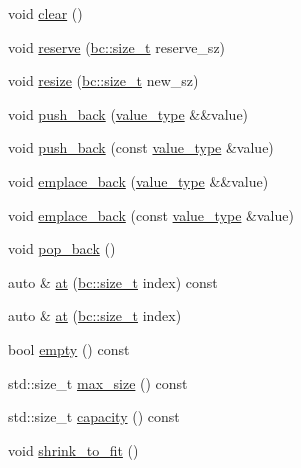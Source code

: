 \begin{DoxyCompactItemize}
\item 
void \hyperlink{structbc_1_1tensors_1_1exprs_1_1Vector_a646e8f07731bfbc89378974310eee5cc}{clear} ()
\item 
void \hyperlink{structbc_1_1tensors_1_1exprs_1_1Vector_acf3a12f0ddeed3faefeab349a1cebe0b}{reserve} (\hyperlink{namespacebc_aaf8e3fbf99b04b1b57c4f80c6f55d3c5}{bc\+::size\+\_\+t} reserve\+\_\+sz)
\item 
void \hyperlink{structbc_1_1tensors_1_1exprs_1_1Vector_a71d51235cb50956b6965102466a7a338}{resize} (\hyperlink{namespacebc_aaf8e3fbf99b04b1b57c4f80c6f55d3c5}{bc\+::size\+\_\+t} new\+\_\+sz)
\item 
void \hyperlink{structbc_1_1tensors_1_1exprs_1_1Vector_a18952a507b7ffe3364789a074642d0d5}{push\+\_\+back} (\hyperlink{structbc_1_1tensors_1_1exprs_1_1Vector_a61ba759af8b26329103ce2b0765dade5}{value\+\_\+type} \&\&value)
\item 
void \hyperlink{structbc_1_1tensors_1_1exprs_1_1Vector_a14256d71cab903b025cd211d2621ad0d}{push\+\_\+back} (const \hyperlink{structbc_1_1tensors_1_1exprs_1_1Vector_a61ba759af8b26329103ce2b0765dade5}{value\+\_\+type} \&value)
\item 
void \hyperlink{structbc_1_1tensors_1_1exprs_1_1Vector_a8d4843ec7993bc29a3c35f8af7faccef}{emplace\+\_\+back} (\hyperlink{structbc_1_1tensors_1_1exprs_1_1Vector_a61ba759af8b26329103ce2b0765dade5}{value\+\_\+type} \&\&value)
\item 
void \hyperlink{structbc_1_1tensors_1_1exprs_1_1Vector_a2e927c004523e23eda06fadc2fa9b836}{emplace\+\_\+back} (const \hyperlink{structbc_1_1tensors_1_1exprs_1_1Vector_a61ba759af8b26329103ce2b0765dade5}{value\+\_\+type} \&value)
\item 
void \hyperlink{structbc_1_1tensors_1_1exprs_1_1Vector_af3c66b395bdbf48d12862d1c3a9c5c1c}{pop\+\_\+back} ()
\item 
auto \& \hyperlink{structbc_1_1tensors_1_1exprs_1_1Vector_ac6b16e6c0550d3298d31c8fac38047e5}{at} (\hyperlink{namespacebc_aaf8e3fbf99b04b1b57c4f80c6f55d3c5}{bc\+::size\+\_\+t} index) const
\item 
auto \& \hyperlink{structbc_1_1tensors_1_1exprs_1_1Vector_a6eb567c4b4a0fdfdf5de8a8e6449a60f}{at} (\hyperlink{namespacebc_aaf8e3fbf99b04b1b57c4f80c6f55d3c5}{bc\+::size\+\_\+t} index)
\item 
bool \hyperlink{structbc_1_1tensors_1_1exprs_1_1Vector_ad040ded42a1cd570993728cb4703cb05}{empty} () const
\item 
std\+::size\+\_\+t \hyperlink{structbc_1_1tensors_1_1exprs_1_1Vector_aa2966322975b102857748f091090fea3}{max\+\_\+size} () const
\item 
std\+::size\+\_\+t \hyperlink{structbc_1_1tensors_1_1exprs_1_1Vector_a65f2772bac84cb1e6105c3880135d3fd}{capacity} () const
\item 
void \hyperlink{structbc_1_1tensors_1_1exprs_1_1Vector_a5858c21a9567c5417e70ac58f5e4bef8}{shrink\+\_\+to\+\_\+fit} ()
\end{DoxyCompactItemize}
